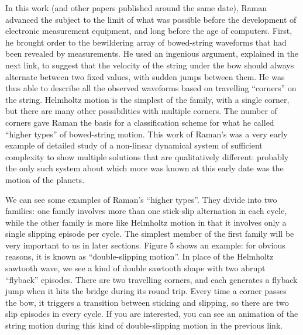 
  In this work (and other papers published around the same date), Raman 
  advanced the subject to the limit of what was possible before the development 
  of electronic measurement equipment, and long before the age of computers. 
  First, he brought order to the bewildering array of bowed-string waveforms 
  that had been revealed by measurements. He used an ingenious argument, 
  explained in the next link, to suggest that the velocity of the string under 
  the bow should always alternate between two fixed values, with sudden jumps 
  between them. He was thus able to describe all the observed waveforms based 
  on travelling “corners” on the string. Helmholtz motion is the simplest of 
  the family, with a single corner, but there are many other possibilities with 
  multiple corners. The number of corners gave Raman the basis for a 
  classification scheme for what he called “higher types” of bowed-string 
  motion. This work of Raman’s was a very early example of detailed study of a 
  non-linear dynamical system of sufficient complexity to show multiple 
  solutions that are qualitatively different: probably the only such system 
  about which more was known at this early date was the motion of the planets. 

  We can see some examples of Raman’s “higher types”. They divide into two 
  families: one family involves more than one stick-slip alternation in each 
  cycle, while the other family is more like Helmholtz motion in that it 
  involves only a single slipping episode per cycle. The simplest member of the 
  first family will be very important to us in later sections. Figure 5 shows 
  an example: for obvious reasons, it is known as “double-slipping motion”. In 
  place of the Helmholtz sawtooth wave, we see a kind of double sawtooth shape 
  with two abrupt “flyback” episodes. There are two travelling corners, and 
  each generates a flyback jump when it hits the bridge during its round trip. 
  Every time a corner passes the bow, it triggers a transition between sticking 
  and slipping, so there are two slip episodes in every cycle. If you are 
  interested, you can see an animation of the string motion during this kind of 
  double-slipping motion in the previous link. 


